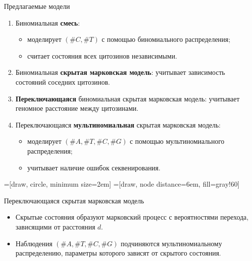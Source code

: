 \documentclass[unicode,mathserif]{beamer}
\begin{document}
\begin{frame}[t]{Предлагаемые модели}
  \begin{enumerate}
  \item Биномиальная \textbf{смесь}:
    \begin{itemize}
    \item моделирует $(\#C, \#T)$ с помощью биномиального распределения;
    \item считает состояния всех цитозинов независимыми.
    \end{itemize}
  \item Биномиальная \textbf{скрытая марковская модель}:
    учитывает зависимость состояний соседних цитозинов.
  \item \textbf{Переключающаяся} биномиальная скрытая марковская модель:
    учитывает геномное расстояние между цитозинами.
  \item Переключающаяся \textbf{мультиномиальная} скрытая марковская модель:
    \begin{itemize}
    \item моделирует $(\#A, \#T, \#C, \#G)$ с помощью мультиномиального распределения;
    \item учитывает наличие ошибок секвенирования.
    \end{itemize}
  \end{enumerate}
\end{frame}


=[draw, circle, minimum size=2em]
=[draw, node distance=6em, fill=gray!60]

\begin{frame}[fragile]{Переключающаяся скрытая марковская модель}
  \centering
  \begin{itemize}
  \item Скрытые состояния образуют марковский процесс с вероятностями
    перехода, зависящими от расстояния $d$.
  \item Наблюдения $(\#A, \#T, \#C, \#G)$ подчиняются мультиномиальному
    распределению, параметры которого зависят от скрытого состояния.
  \end{itemize}
\end{frame}
\end{document}

